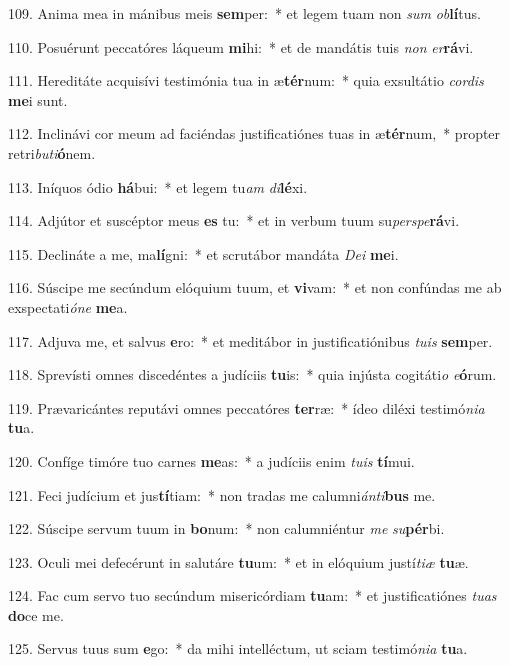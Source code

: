 109. Anima mea in mánibus meis \textbf{sem}per:~*  et legem tuam non \textit{sum} \textit{ob}\textbf{lí}tus.\

110. Posuérunt peccatóres láqueum \textbf{mi}hi:~*  et de mandátis tuis \textit{non} \textit{er}\textbf{rá}vi.\

111. Hereditáte acquisívi testimónia tua in æ\textbf{tér}num:~*  quia exsultátio \textit{cor}\textit{dis} \textbf{me}i sunt.\

112. Inclinávi cor meum ad faciéndas justificatiónes tuas in æ\textbf{tér}num,~*  propter retri\textit{bu}\textit{ti}\textbf{ó}nem.\

113. Iníquos ódio \textbf{há}bui:~*  et legem tu\textit{am} \textit{di}\textbf{lé}xi.\

114. Adjútor et suscéptor meus \textbf{es} tu:~*  et in verbum tuum su\textit{per}\textit{spe}\textbf{rá}vi.\

115. Declináte a me, ma\textbf{lí}gni:~*  et scrutábor mandáta \textit{De}\textit{i} \textbf{me}i.\

116. Súscipe me secúndum elóquium tuum, et \textbf{vi}vam:~*  et non confúndas me ab exspectati\textit{ó}\textit{ne} \textbf{me}a.\

117. Adjuva me, et salvus \textbf{e}ro:~*  et meditábor in justificatiónibus \textit{tu}\textit{is} \textbf{sem}per.\

118. Sprevísti omnes discedéntes a judíciis \textbf{tu}is:~*  quia injústa cogitáti\textit{o} \textit{e}\textbf{ó}rum.\

119. Prævaricántes reputávi omnes peccatóres \textbf{ter}ræ:~*  ídeo diléxi testimó\textit{ni}\textit{a} \textbf{tu}a.\

120. Confíge timóre tuo carnes \textbf{me}as:~*  a judíciis enim \textit{tu}\textit{is} \textbf{tí}mui.\

121. Feci judícium et jus\textbf{tí}tiam:~*  non tradas me calumni\textit{án}\textit{ti}\textbf{bus} me.\

122. Súscipe servum tuum in \textbf{bo}num:~*  non calumniéntur \textit{me} \textit{su}\textbf{pér}bi.\

123. Oculi mei defecérunt in salutáre \textbf{tu}um:~*  et in elóquium justí\textit{ti}\textit{æ} \textbf{tu}æ.\

124. Fac cum servo tuo secúndum misericórdiam \textbf{tu}am:~*  et justificatiónes \textit{tu}\textit{as} \textbf{do}ce me.\

125. Servus tuus sum \textbf{e}go:~*  da mihi intelléctum, ut sciam testimó\textit{ni}\textit{a} \textbf{tu}a.\

